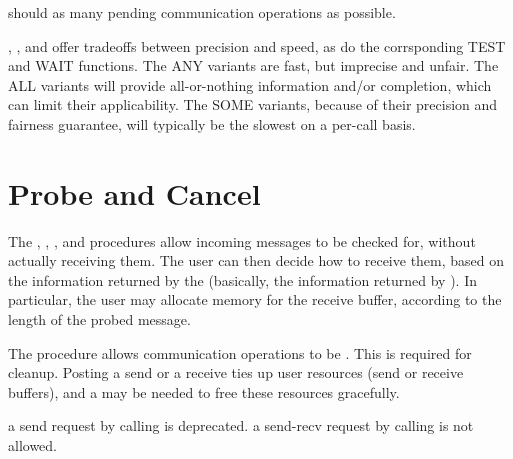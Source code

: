 \begin{implementors}
 should  as many pending communication operations as
possible.
\end{implementors}

\begin{users}
, \vlgb{}, and 
offer tradeoffs between precision and speed, as do the corrsponding TEST and WAIT functions. The ANY variants are fast, but imprecise and unfair.
The ALL variants will provide all-or-nothing information and/or completion, which can limit their applicability. The SOME variants, because
of their precision and fairness guarantee, will typically be the slowest on a per-call basis.
\end{users}

\section{Probe and Cancel}
\label{sec:pt2pt-probe}

The , ,
, and 
procedures allow incoming messages to be checked for,
without
actually receiving them.  The user can then decide how to receive them, based
on the information returned by the  (basically, the information
returned by ).  In particular, the user may allocate memory for
the receive buffer, according to the length of the probed message.

The  procedure allows
communication operations to be
.
This
is required for cleanup.  Posting a send or a receive ties up user resources
(send or receive buffers), and a  may be needed to free these resources
gracefully.

 a send request by calling  is deprecated.
 a send-recv request by calling  is not allowed.

